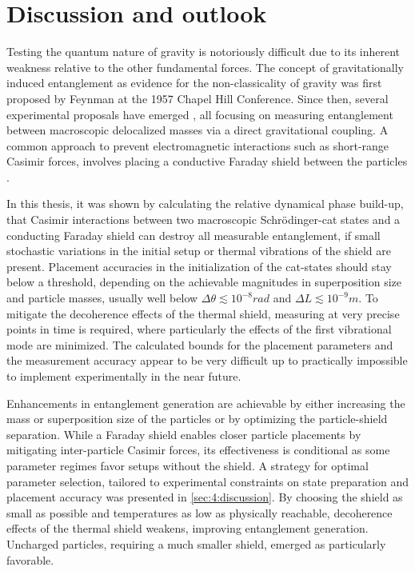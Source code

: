 \chapter{Discussion and outlook}\label{cha:discussion-outlook}
Testing the quantum nature of gravity is notoriously difficult due to its inherent weakness relative to the other fundamental forces.
The concept of gravitationally induced entanglement as evidence for the non-classicality of gravity was first proposed by Feynman at the 1957 Chapel Hill Conference.
Since then, several experimental proposals have emerged \cite{Bose_2017,Marletto_2017, Krisnanda_2020}, all focusing on measuring entanglement between macroscopic delocalized masses via a direct gravitational coupling.
A common approach to prevent electromagnetic interactions such as short-range Casimir forces, involves placing a conductive Faraday shield between the particles \cite{Kamp_2020}.

In this thesis, it was shown by calculating the relative dynamical phase build-up, that Casimir interactions between two macroscopic Schrödinger-cat states and a conducting Faraday shield can destroy all measurable entanglement, if small stochastic variations in the initial setup or thermal vibrations of the shield are present.
Placement accuracies in the initialization of the cat-states should stay below a threshold, depending on the achievable magnitudes in superposition size and particle masses, usually well below $\Delta \theta \lesssim 10^{-8}\si{rad}$ and $\Delta L \lesssim 10^{-9}\si{m}$.
To mitigate the decoherence effects of the thermal shield, measuring at very precise points in time is required, where particularly the effects of the first vibrational mode are minimized.
The calculated bounds for the placement parameters and the measurement accuracy appear to be very difficult up to practically impossible to implement experimentally in the near future.

Enhancements in entanglement generation are achievable by either increasing the mass or superposition size of the particles or by optimizing the particle-shield separation.
While a Faraday shield enables closer particle placements by mitigating inter-particle Casimir forces, its effectiveness is conditional as some parameter regimes favor setups without the shield.
A strategy for optimal parameter selection, tailored to experimental constraints on state preparation and placement accuracy was presented in \cref{sec:4:discussion}.
By choosing the shield as small as possible and temperatures as low as physically reachable, decoherence effects of the thermal shield weakens, improving entanglement generation.
Uncharged particles, requiring a much smaller shield, emerged as particularly favorable.

